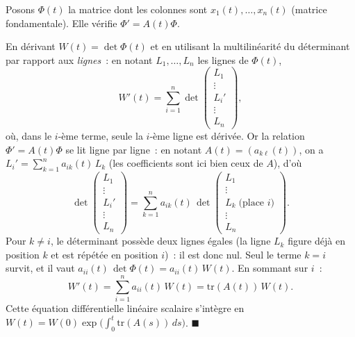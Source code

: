 \begin{mdframed}[style=proofbar]
  Posons $\Phi(t)$ la matrice dont les colonnes sont $x_1(t),\ldots,x_n(t)$
  (matrice fondamentale). Elle vérifie $\Phi' = A(t)\Phi$.

  En dérivant $W(t) = \det\Phi(t)$ et en utilisant la multilinéarité du
  déterminant par rapport aux \emph{lignes}~: en notant $L_1,\ldots,L_n$
  les lignes de $\Phi(t)$,
  \[
    W'(t) = \sum_{i=1}^n
      \det\begin{pmatrix}L_1\\ \vdots\\ L_i'\\ \vdots\\ L_n\end{pmatrix},
  \]
  où, dans le $i$-ème terme, seule la $i$-ème ligne est dérivée.
  Or la relation $\Phi' = A(t)\Phi$ se lit ligne par ligne~: en notant
  $A(t)=(a_{k\ell}(t))$, on a $L_i' = \sum_{k=1}^n a_{ik}(t)\,L_k$
  (les coefficients sont ici bien ceux de $A$), d'où
  \[
    \det\begin{pmatrix}L_1\\ \vdots\\ L_i'\\ \vdots\\ L_n\end{pmatrix}
      = \sum_{k=1}^n a_{ik}(t)\,
        \det\begin{pmatrix}L_1\\ \vdots\\ L_k \;\text{(place $i$)}\\ \vdots\\ L_n\end{pmatrix}.
  \]
  Pour $k \neq i$, le déterminant possède deux lignes égales
  (la ligne $L_k$ figure déjà en position $k$ et est répétée en position $i$)~:
  il est donc nul. Seul le terme $k=i$ survit, et il vaut
  $a_{ii}(t)\,\det\Phi(t) = a_{ii}(t)\,W(t)$. En sommant sur $i$~:
  \[
    W'(t) = \sum_{i=1}^n a_{ii}(t)\,W(t) = \mathrm{tr}(A(t))\,W(t).
  \]
  Cette équation différentielle linéaire scalaire s'intègre en
  $W(t) = W(0)\exp\!\bigl(\int_0^t\mathrm{tr}(A(s))\,ds\bigr)$.
  $\blacksquare$
\end{mdframed}

\decsep{}



